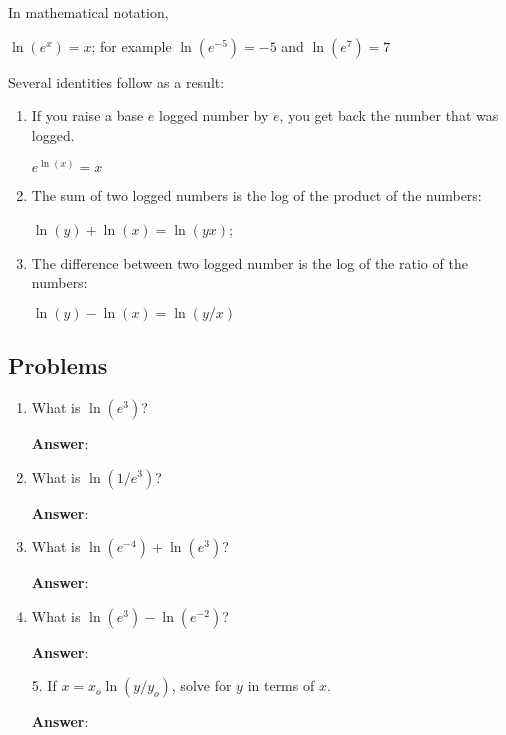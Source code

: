 \documentclass{article}
\begin{document}
In mathematical notation,

$\ln(e^x) = x$; for example $\ln(e^{-5}) = -5$ and $\ln(e^7) = 7$

Several identities follow as a result:

\begin{enumerate}

  \item If you raise a base $e$ logged number by $e$, you get back the number that was logged.

        $e^{\ln(x)} = x$

  \item The sum of two logged numbers is the log of the product of the numbers:

        $\ln(y) + \ln(x) = \ln(yx)$;

  \item The difference between two logged number is the log of the ratio of the numbers:

        $\ln(y) - \ln(x) = \ln(y/x)$

\end{enumerate}

\subsection{Problems}

\begin{enumerate}

  \item What is $\ln(e^3)$?

        \ifsolutions
        \textbf{Answer}:
        \else
        \vskip 24pt
        \fi

  \item What is $\ln(1/e^3)$?

        \ifsolutions
        \textbf{Answer}:
        \else
        \vskip 24pt
        \fi

  \item What is $\ln(e^{-4})+\ln(e^{3})$?

        \ifsolutions
        \textbf{Answer}:
        \else
        \vskip 24pt
        \fi

  \item What is $\ln(e^3)-\ln(e^{-2})$?

        \ifsolutions
        \textbf{Answer}:
        \else
        \vskip 24pt
        \fi

\end{enumerate}

\begin{enumerate}

  \item[5.] If $x = x_o\ln(y/y_o)$, solve for $y$ in terms of $x$.

            \ifsolutions
            \textbf{Answer}:
            \else
            \vskip 24pt
            \fi

\end{enumerate}
\end{document}
